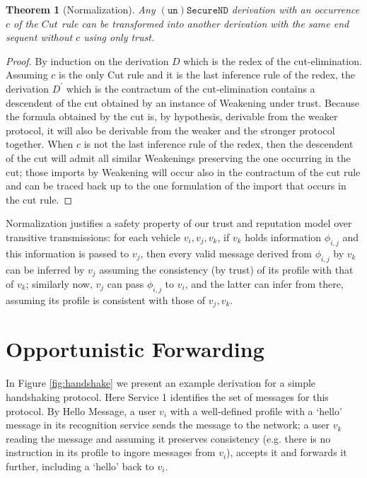 \documentclass[compsoc, conference, letterpaper, 10pt, times]{IEEEtran}
\newtheorem{theorem}{Theorem}
\begin{document}

\begin{theorem}[Normalization]
Any $\mathtt{(un)SecureND}$ derivation with an occurrence $c$ of the $Cut$ rule can be transformed into another derivation with the same end sequent without $c$ using only trust.
\end{theorem}

\begin{proof}
	By induction on the derivation $D$ which is the redex of the cut-elimination. Assuming $c$ is the only Cut rule and it is the last inference rule of the redex, the derivation $D^\prime$ which is the contractum of the cut-elimination contains a descendent of the cut obtained by an instance of Weakening under trust. Because the formula obtained by the cut is, by hypothesis, derivable from the weaker protocol, it will also be derivable from the weaker and the stronger protocol together. When $c$ is not the last inference rule of the redex, then the descendent of the cut will admit all similar Weakenings preserving the one occurring in the cut; those imports by Weakening will occur also in the contractum of the cut rule and can be traced back up to the one formulation of the import that occurs in the cut rule.
\end{proof}

Normalization justifies a safety property of our trust and reputation model over transitive transmissions: for each vehicle $v_{i}, v_{j}, v_{k}$, if $v_{k}$ holds information $\phi_{i,j}$ and this information is passed to $v_{j}$, then every valid message derived from $\phi_{i,j}$ by $v_{k}$ can be inferred by $v_{j}$ assuming the consistency (by trust) of its profile with that of $v_{k}$; similarly now, $v_{j}$ can pass $\phi_{i,j}$ to $v_{i}$, and the latter can infer from there, assuming its profile is consistent with those of $v_{j}, v_{k}$.



\section{Opportunistic Forwarding}\label{sec:opportunistic}


In Figure \ref{fig:handshake} we present an example derivation for a simple handshaking protocol. Here Service 1 identifies the set of messages for this protocol. By Hello Message, a user $v_{i}$ with a well-defined profile with a `hello' message in its recognition service sends the message to the network;   a user $v_{k}$ reading the message and assuming it preserves consistency (e.g. there is no instruction in its profile to ingore messages from $v_{i}$), accepts it and forwards it further, including a `hello' back to $v_{i}$.
\end{document}
